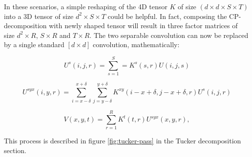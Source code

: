 In these scenarios, a simple reshaping of the 4D tensor $K$ of size $(d \times d \times S \times T)$ into a 3D tensor of size $d^2 \times S \times T$ could be helpful. In fact, composing the CP-decomposition with newly shaped tensor will result in three factor matrices of size $d^2 \times R$, $S \times R$ and $T \times R$. The two separable convolution can now be replaced by a single standard $[d \times d]$ convolution, mathematically: 

\begin{equation}
\label{eq:cpd1}
    U^s(i,j,r) =\sum^{S}_{s=1}=K^s(s,r)U(i,j,s)    
\end{equation}

\begin{equation}
    U^{syx}(i,y,r) = \sum_{i=x-\delta}^{x + \delta} \sum_{j=y-\delta}^{y+\delta} K^{xy} (i-x+\delta, j-x + \delta,r)U^{s}(i,j,r)
\end{equation}

\begin{equation}
    V(x,y,t) = \sum_{r=1}^R K^t (t,r) U^{syx}(x,y,r),
\end{equation}

This process is described in figure \ref{fig:tucker-pass} in the Tucker decomposition section. 

\pagebreak

